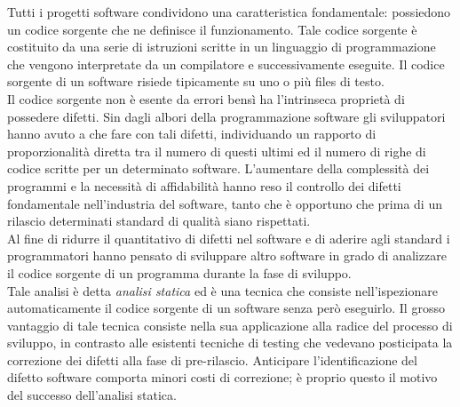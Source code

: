 Tutti i progetti software condividono una caratteristica fondamentale: possiedono un codice sorgente che ne definisce il funzionamento. Tale codice sorgente è costituito da una serie di istruzioni scritte in un linguaggio di programmazione che vengono interpretate da un compilatore e successivamente eseguite. Il codice sorgente di un software risiede tipicamente su uno o più files di testo.\\
Il codice sorgente non è esente da errori bensì ha l'intrinseca proprietà di possedere difetti. Sin dagli albori della programmazione software gli sviluppatori hanno avuto a che fare con tali difetti, individuando un rapporto di proporzionalità diretta tra il numero di questi ultimi ed il numero di righe di codice scritte per un determinato software. L'aumentare della complessità dei programmi e la necessità di affidabilità hanno reso il controllo dei difetti fondamentale nell'industria del software, tanto che è opportuno che prima di un rilascio determinati standard di qualità siano rispettati. \\
Al fine di ridurre il quantitativo di difetti nel software e di aderire agli standard i programmatori hanno pensato di sviluppare altro software in grado di analizzare il codice sorgente di un programma durante la fase di sviluppo.\\
Tale analisi è detta \emph{analisi statica} ed è una tecnica che consiste nell'ispezionare automaticamente il codice sorgente di un software senza però eseguirlo. Il grosso vantaggio di tale tecnica consiste nella sua applicazione alla radice del processo di sviluppo, in contrasto alle esistenti tecniche di testing che vedevano posticipata la correzione dei difetti alla fase di pre-rilascio. Anticipare l'identificazione del difetto software comporta minori costi di correzione; è proprio questo il motivo del successo dell'analisi statica.

